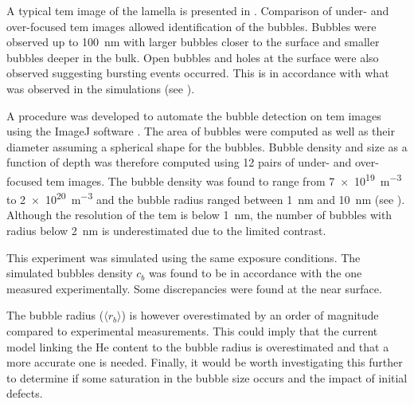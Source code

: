 A typical \gls{tem} image of the lamella is presented in .
Comparison of under- and over-focused \gls{tem} images allowed identification of the bubbles.
Bubbles were observed up to \SI{100}{nm} with larger bubbles closer to the surface and smaller bubbles deeper in the bulk.
Open bubbles and holes at the surface were also observed suggesting bursting events occurred.
This is in accordance with what was observed in the simulations (see ).

A procedure was developed to automate the bubble detection on \gls{tem} images using the ImageJ software .
The area of bubbles were computed as well as their diameter assuming a spherical shape for the bubbles.
Bubble density and size as a function of depth was therefore computed using 12 pairs of under- and over-focused \gls{tem} images.
The bubble density was found to range from \SI{7e19}{m^{-3}} to \SI{2e20}{m^{-3}} and the bubble radius ranged between \SI{1}{nm} and \SI{10}{nm} (see ).
Although the resolution of the \gls{tem} is below \SI{1}{nm}, the number of bubbles with radius below \SI{2}{nm} is underestimated due to the limited contrast.

This experiment was simulated using the same exposure conditions.
The simulated bubbles density $c_b$ was found to be in accordance with the one measured experimentally.
Some discrepancies were found at the near surface.

The bubble radius ($\langle r_b \rangle$) is however overestimated by an order of magnitude compared to experimental measurements.
This could imply that the current model linking the He content to the bubble radius is overestimated and that a more accurate one is needed.
Finally, it would be worth investigating this further to determine if some saturation in the bubble size occurs and the impact of initial defects.


